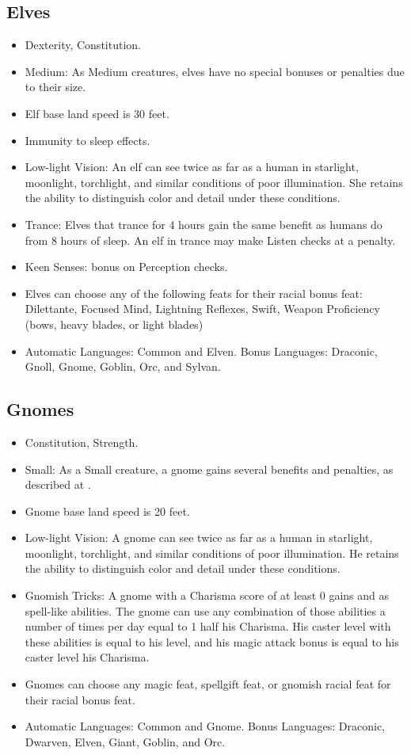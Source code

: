 \subsection{Elves}
\begin{itemize}
\item {} Dexterity,  Constitution.
\item Medium: As Medium creatures, elves have no special bonuses or penalties due to their size.
\item Elf base land speed is 30 feet.
\item Immunity to sleep effects.
\item Low-light Vision: An elf can see twice as far as a human in starlight, moonlight, torchlight, and similar conditions of poor illumination. She retains the ability to distinguish color and detail under these conditions.
 \item Trance: Elves that trance for 4 hours gain the same benefit as humans do from 8 hours of sleep. An elf in trance may make Listen checks at a  penalty.
\item Keen Senses:  bonus on Perception checks.
\item Elves can choose any of the following feats for their racial bonus feat: Dilettante, Focused Mind, Lightning Reflexes, Swift, Weapon Proficiency (bows, heavy blades, or light blades)
\item Automatic Languages: Common and Elven. Bonus Languages: Draconic, Gnoll, Gnome, Goblin, Orc, and Sylvan.
\end{itemize}

\subsection{Gnomes}
\begin{itemize}
\item {} Constitution,  Strength.
\item Small: As a Small creature, a gnome gains several benefits and penalties, as described at .
\item Gnome base land speed is 20 feet.
\item Low-light Vision: A gnome can see twice as far as a human in starlight, moonlight, torchlight, and similar conditions of poor illumination. He retains the ability to distinguish color and detail under these conditions.
\item Gnomish Tricks: A gnome with a Charisma score of at least 0 gains  and  as spell-like abilities. The gnome can use any combination of those abilities a number of times per day equal to 1 \add half his Charisma. His caster level with these abilities is equal to his level, and his magic attack bonus is equal to his caster level \add his Charisma.

\item Gnomes can choose any magic feat, spellgift feat, or gnomish racial feat for their racial bonus feat.
\item Automatic Languages: Common and Gnome. Bonus Languages: Draconic, Dwarven, Elven, Giant, Goblin, and Orc.
\end{itemize}

